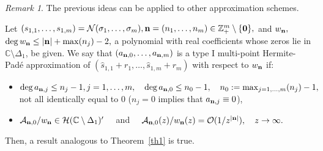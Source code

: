\documentclass[10pt,a4paper]{article}
\theoremstyle{definition}
\theoremstyle{remark}
\newtheorem{remark}[theorem]{Remark}
\numberwithin{equation}{section}
\begin{document}
\begin{remark}  The previous ideas can be applied to other approximation schemes.\par
 Let $(s_{1,1},\ldots,s_{1,m}) = \mathcal{N}(\sigma_1,\ldots,\sigma_m), {\bf n} = (n_1,\ldots,n_m) \in \mathbb{Z}_+^{m} \setminus \{{\bf 0}\},$ and $w_{\bf n},$ $ \deg w_{\bf n} \leq |{\bf n}| + \max(n_j)-2,$ a polynomial with real coefficients whose zeros lie in $\mathbb{C} \setminus\Delta_1$, be given. We say that $\left(a_{{\bf n},0}, \ldots, a_{{\bf n},m}\right)$ is a  type I multi-point Hermite-Pad\'e approximation of $(\widehat{s}_{1,1}+r_1,\ldots,\widehat{s}_{1,m}+r_m)$ with respect to $w_{\bf n}$ if:
\begin{itemize}
\item[i)] $\deg a_{{\bf n},j} \leq n_j -1, j=1,\ldots,m, \quad \deg a_{{\bf n},0} \leq n_0 -1, \quad n_0 := \max_{j=1,\ldots,m} (n_j) -1,\quad$ not all identically equal to $0$ ($n_j = 0$ implies that $a_{{\bf n},j} \equiv 0$),
\item[ii)] $\mathcal{A}_{{\bf n},0}/w_{\bf n} \in \mathcal{H}(\mathbb{C} \setminus \Delta_1)^{\prime}\quad$ and  $\quad \mathcal{A}_{{\bf n},0}(z)/w_{\bf n}(z)= \mathcal{O}(1/z^{|{\bf n}|}), \quad z\to \infty.$
\end{itemize}
Then, a  result analogous to Theorem~\ref{th1} is true.
\end{remark}
\end{document}
